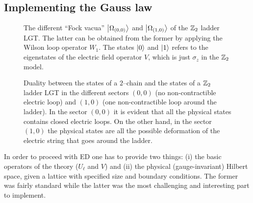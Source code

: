 %
%

\subsection{Implementing the Gauss law}%
\label{sub:implementing_the_gauss_law}

\begin{figure}[t]
    \centering
    
    \caption{The different ``Fock vacua'' $\ket{\Omega_{(0,0)}}$ and $\ket{\Omega_{(1,0)}}$ of the $\mathbb{Z}_2$ ladder LGT.
        The latter can be obtained from the former by applying the Wilson loop operator $W_1$.
        The states $\ket{0}$ and $\ket{1}$ refers to the eigenstates of the electric field operator $V$, which is just $\sigma_{z}$ in the $\mathbb{Z}_2$ model.
    }
    \label{fig:z2_vacua}
\end{figure}

\begin{figure*}
    \centering
    
    \caption{Duality between the states of a $2$--chain and the states of a $\mathbb{Z}_2$ ladder LGT in the different sectors $(0,0)$ (no non-contractible electric loop) and $(1,0)$ (one non-contractible loop around the ladder).
        In the sector $(0,0)$ it is evident that all the physical states contains closed electric loops.
        On the other hand, in the sector $(1,0)$ the physical states are all the possible deformation of the electric string that goes around the ladder.}
    \label{fig:z2_states}
\end{figure*}

In order to proceed with ED one has to provide two things: (i) the basic operators of the theory ($U_{\ell}$ and $V$) and (ii) the physical (gauge-invariant) Hilbert space, given a lattice with specified size and boundary conditions.
The former was fairly standard while the latter was the most challenging and interesting part to implement.

